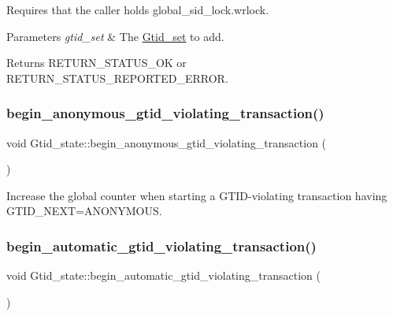 Requires that the caller holds global\+\_\+sid\+\_\+lock.\+wrlock.


\begin{DoxyParams}{Parameters}
{\em gtid\+\_\+set} & The \mbox{\hyperlink{classGtid__set}{Gtid\+\_\+set}} to add. \\
\hline
\end{DoxyParams}
\begin{DoxyReturn}{Returns}
R\+E\+T\+U\+R\+N\+\_\+\+S\+T\+A\+T\+U\+S\+\_\+\+OK or R\+E\+T\+U\+R\+N\+\_\+\+S\+T\+A\+T\+U\+S\+\_\+\+R\+E\+P\+O\+R\+T\+E\+D\+\_\+\+E\+R\+R\+OR. 
\end{DoxyReturn}
\mbox{\label{classGtid__state_a315fbccbb1afe3414b5ef732027d2af6}} 
\subsubsection{\texorpdfstring{begin\+\_\+anonymous\+\_\+gtid\+\_\+violating\+\_\+transaction()}{begin\_anonymous\_gtid\_violating\_transaction()}}
{\footnotesize\ttfamily void Gtid\+\_\+state\+::begin\+\_\+anonymous\+\_\+gtid\+\_\+violating\+\_\+transaction (\begin{DoxyParamCaption}{ }\end{DoxyParamCaption})\hspace{0.3cm}{\ttfamily [inline]}}

Increase the global counter when starting a G\+T\+ID-\/violating transaction having G\+T\+I\+D\+\_\+\+N\+E\+XT=A\+N\+O\+N\+Y\+M\+O\+US. \mbox{\label{classGtid__state_abda6d7defb7e4a1477c7a33ce8ee1263}} 
\subsubsection{\texorpdfstring{begin\+\_\+automatic\+\_\+gtid\+\_\+violating\+\_\+transaction()}{begin\_automatic\_gtid\_violating\_transaction()}}
{\footnotesize\ttfamily void Gtid\+\_\+state\+::begin\+\_\+automatic\+\_\+gtid\+\_\+violating\+\_\+transaction (\begin{DoxyParamCaption}{ }\end{DoxyParamCaption})\hspace{0.3cm}{\ttfamily [inline]}}

